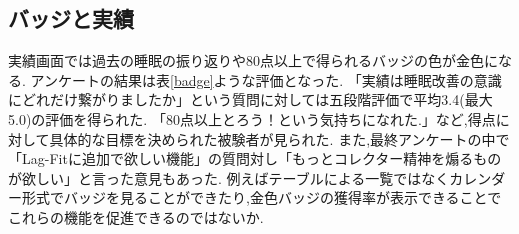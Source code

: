 \subsection{バッジと実績}
実績画面では過去の睡眠の振り返りや80点以上で得られるバッジの色が金色になる.
アンケートの結果は表\ref{badge}ような評価となった.
「実績は睡眠改善の意識にどれだけ繋がりましたか」という質問に対しては五段階評価で平均3.4(最大5.0)の評価を得られた.
「80点以上とろう！という気持ちになれた.」など,得点に対して具体的な目標を決められた被験者が見られた.
また,最終アンケートの中で「Lag-Fitに追加で欲しい機能」の質問対し「もっとコレクター精神を煽るものが欲しい」と言った意見もあった.
例えばテーブルによる一覧ではなくカレンダー形式でバッジを見ることができたり,金色バッジの獲得率が表示できることでこれらの機能を促進できるのではないか.

\begin{table}[htbp]
	\begin{center}
 	\end{center}
 	\caption{最終アンケート:バッジと実績について}
 	\label{badge}
\end{table}

